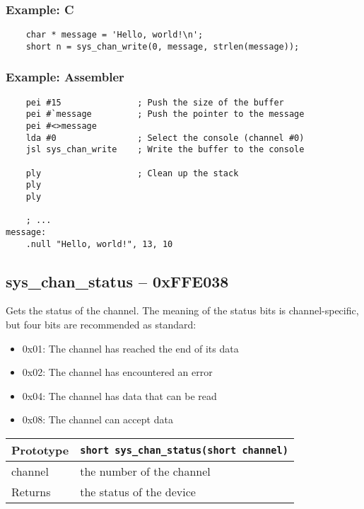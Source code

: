 \subsubsection*{Example: C}
\begin{lstlisting}
    char * message = 'Hello, world!\n';
    short n = sys_chan_write(0, message, strlen(message));
\end{lstlisting}

\subsubsection*{Example: Assembler}
\begin{verbatim}
    pei #15               ; Push the size of the buffer
    pei #`message         ; Push the pointer to the message
    pei #<>message
    lda #0                ; Select the console (channel #0)
    jsl sys_chan_write    ; Write the buffer to the console

    ply                   ; Clean up the stack
    ply
    ply
    
    ; ...
message:
    .null "Hello, world!", 13, 10
\end{verbatim}

\subsection*{sys\_chan\_status -- 0xFFE038}
Gets the status of the channel. The meaning of the status bits is channel-specific, but four bits are recommended as standard:

\begin{itemize}
\item 0x01: The channel has reached the end of its data
\item 0x02: The channel has encountered an error
\item 0x04: The channel has data that can be read
\item 0x08: The channel can accept data
\end{itemize}

\bigskip

\begin{tabular}{|l||l|} \hline
Prototype & \lstinline!short sys_chan_status(short channel)! \\ \hline
channel & the number of the channel \\ \hline
Returns & the status of the device \\ \hline
\end{tabular}

